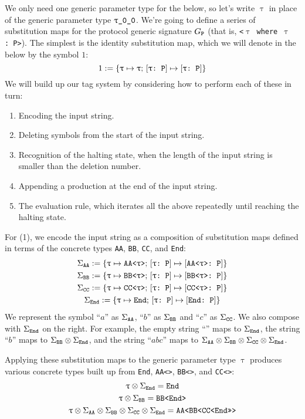 \documentclass[../generics]{subfiles}
\begin{document}
We only need one generic parameter type for the below, so let's write $\uptau$ in place of the generic parameter type $\ttgp{0}{0}$. We're going to define a series of substitution maps for the protocol generic signature $G_{\texttt{P}}$ (that is, \texttt{<$\uptau$ where $\uptau$:~P>}). The simplest is the identity substitution map, which we will denote in the below by the symbol $1$:
\[1 := \{\texttt{$\uptau$} \mapsto \texttt{$\uptau$};\,[\texttt{$\uptau$:~P}] \mapsto [\texttt{$\uptau$:~P}]\}\]
We will build up our tag system by considering how to perform each of these in turn:
\begin{enumerate}
\item Encoding the input string.
\item Deleting symbols from the start of the input string.
\item Recognition of the halting state, when the length of the input string is smaller than the deletion number.
\item Appending a production at the end of the input string.
\item The evaluation rule, which iterates all the above repeatedly until reaching the halting state.
\end{enumerate}

For (1), we encode the input string as a composition of substitution maps defined in terms of the concrete types \texttt{AA}, \texttt{BB}, \texttt{CC}, and \texttt{End}:
\begin{gather*}
\Sigma_{\texttt{AA}} := \{\texttt{$\uptau$} \mapsto \texttt{AA<$\uptau$>};\,[\texttt{$\uptau$:~P}] \mapsto [\texttt{AA<$\uptau$>:~P}]\}\\
\Sigma_{\texttt{BB}} := \{\texttt{$\uptau$} \mapsto \texttt{BB<$\uptau$>};\,[\texttt{$\uptau$:~P}] \mapsto [\texttt{BB<$\uptau$>:~P}]\}\\
\Sigma_{\texttt{CC}} := \{\texttt{$\uptau$} \mapsto \texttt{CC<$\uptau$>};\,[\texttt{$\uptau$:~P}] \mapsto [\texttt{CC<$\uptau$>:~P}]\}\\
\Sigma_{\texttt{End}} := \{\texttt{$\uptau$} \mapsto \texttt{End};\,[\texttt{$\uptau$:~P}] \mapsto [\texttt{End:~P}]\}
\end{gather*}
We represent the symbol ``$a$'' as $\Sigma_{\texttt{AA}}$, ``$b$'' as $\Sigma_{\texttt{BB}}$ and ``$c$'' as $\Sigma_{\texttt{CC}}$. We also compose with $\Sigma_{\texttt{End}}$ on the right. For example, the empty string ``'' maps to $\Sigma_{\texttt{End}}$, the string ``$b$'' maps to $\Sigma_{\texttt{BB}}\otimes\Sigma_{\texttt{End}}$, and the string ``$abc$'' maps to $\Sigma_{\texttt{AA}}\otimes\Sigma_{\texttt{BB}}\otimes\Sigma_{\texttt{CC}}\otimes\Sigma_{\texttt{End}}$.

Applying these substitution maps to the generic parameter type $\uptau$ produces various concrete types built up from \texttt{End}, \texttt{AA<>}, \texttt{BB<>}, and \texttt{CC<>}:
\begin{gather*}
\uptau\otimes\Sigma_{\texttt{End}} = \texttt{End}\\
\uptau\otimes\Sigma_{\texttt{BB}} = \texttt{BB<End>}\\
\uptau\otimes\Sigma_{\texttt{AA}}\otimes\Sigma_{\texttt{BB}}\otimes\Sigma_{\texttt{CC}}\otimes\Sigma_{\texttt{End}} = \texttt{AA<BB<CC<End>>>}
\end{gather*}
\end{document}
